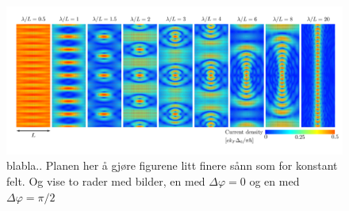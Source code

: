 \begin{figure}[hhh]
\centering
\includegraphics[width=17cm,clip=true,trim = 1.4cm 1.5cm 0.6cm 1cm]{fig/dist2_pi-2}
\caption{blabla.. Planen her å gjøre figurene litt finere sånn som for konstant felt. Og vise to rader med bilder, en med $\Delta \varphi = 0$ og en med $\Delta \varphi = \pi/2$}
\label{fig:dist2_pi-2}
\end{figure}

